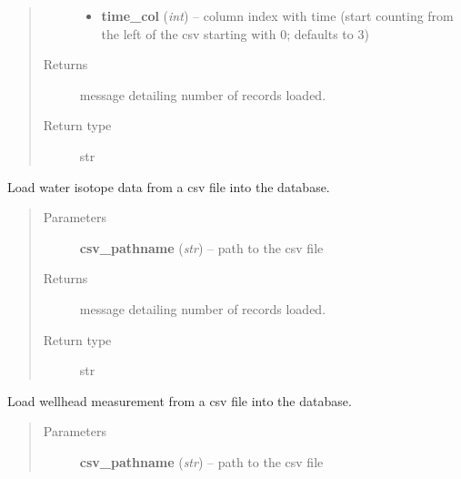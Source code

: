 \documentclass[letterpaper,10pt,english]{sphinxmanual}
\begin{document}
\begin{fulllineitems}
\begin{fulllineitems}
\begin{quote}
\begin{description}
\begin{itemize}
\item {} 
\textbf{time\_col} (\emph{int}) -- column index with time (start counting from the left of the csv starting with 0; defaults to 3)

\end{itemize}

\item[{Returns}] \leavevmode
message detailing number of records loaded.

\item[{Return type}] \leavevmode
str

\end{description}\end{quote}

\end{fulllineitems}


\begin{fulllineitems}
\label{modules:webb_utils.upload_data.UploadData.load_water_isotope_data}
Load water isotope data from a csv file into the database.
\begin{quote}\begin{description}
\item[{Parameters}] \leavevmode
\textbf{csv\_pathname} (\emph{str}) -- path to the csv file

\item[{Returns}] \leavevmode
message detailing number of records loaded.

\item[{Return type}] \leavevmode
str

\end{description}\end{quote}

\end{fulllineitems}


\begin{fulllineitems}
\label{modules:webb_utils.upload_data.UploadData.load_wellhead_measurement_data}
Load wellhead measurement from a csv file into the database.
\begin{quote}\begin{description}
\item[{Parameters}] \leavevmode
\textbf{csv\_pathname} (\emph{str}) -- path to the csv file


\end{description}
\end{quote}
\end{fulllineitems}
\end{fulllineitems}
\end{document}
